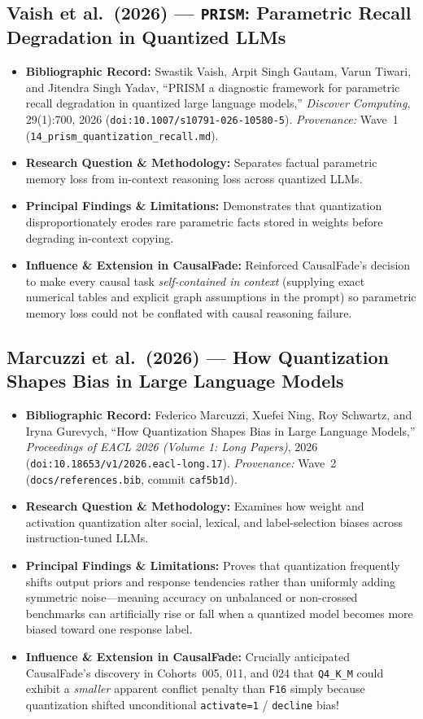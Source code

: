 \subsection{Vaish et al.\ (2026) --- \texttt{PRISM}: Parametric Recall Degradation in Quantized LLMs \citep{vaish2026prism}}
\begin{itemize}
  \item \textbf{Bibliographic Record:} Swastik Vaish, Arpit Singh Gautam, Varun Tiwari, and Jitendra Singh Yadav, ``PRISM a diagnostic framework for parametric recall degradation in quantized large language models,'' \emph{Discover Computing}, 29(1):700, 2026 (\texttt{doi:10.1007/s10791-026-10580-5}). \emph{Provenance:} Wave~1 (\texttt{14\_prism\_quantization\_recall.md}).
  \item \textbf{Research Question \& Methodology:} Separates factual parametric memory loss from in-context reasoning loss across quantized LLMs.
  \item \textbf{Principal Findings \& Limitations:} Demonstrates that quantization disproportionately erodes rare parametric facts stored in weights before degrading in-context copying.
  \item \textbf{Influence \& Extension in CausalFade:} Reinforced CausalFade's decision to make every causal task \emph{self-contained in context} (supplying exact numerical tables and explicit graph assumptions in the prompt) so parametric memory loss could not be conflated with causal reasoning failure.
\end{itemize}

\subsection{Marcuzzi et al.\ (2026) --- How Quantization Shapes Bias in Large Language Models \citep{marcuzzi2026bias}}
\begin{itemize}
  \item \textbf{Bibliographic Record:} Federico Marcuzzi, Xuefei Ning, Roy Schwartz, and Iryna Gurevych, ``How Quantization Shapes Bias in Large Language Models,'' \emph{Proceedings of EACL 2026 (Volume 1: Long Papers)}, 2026 (\texttt{doi:10.18653/v1/2026.eacl-long.17}). \emph{Provenance:} Wave~2 (\texttt{docs/references.bib}, commit \texttt{caf5b1d}).
  \item \textbf{Research Question \& Methodology:} Examines how weight and activation quantization alter social, lexical, and label-selection biases across instruction-tuned LLMs.
  \item \textbf{Principal Findings \& Limitations:} Proves that quantization frequently shifts output priors and response tendencies rather than uniformly adding symmetric noise---meaning accuracy on unbalanced or non-crossed benchmarks can artificially rise or fall when a quantized model becomes more biased toward one response label.
  \item \textbf{Influence \& Extension in CausalFade:} Crucially anticipated CausalFade's discovery in Cohorts~005, 011, and 024 that \texttt{Q4\_K\_M} could exhibit a \emph{smaller} apparent conflict penalty than \texttt{F16} simply because quantization shifted unconditional \texttt{activate=1} / \texttt{decline} bias!
\end{itemize}

